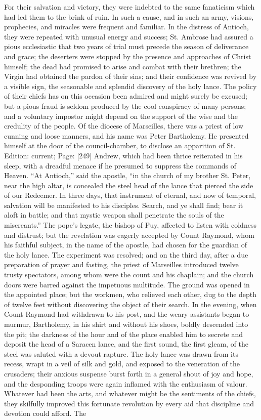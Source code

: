 For their salvation and victory, they were indebted to the same fanaticism which had led them to the brink of ruin. In such a cause, and in such an army, visions, prophecies, and miracles were frequent and familiar. In the distress of Antioch, they were repeated with unusual energy and success; St. Ambrose had assured a pious ecclesiastic that two years of trial must precede the season of deliverance and grace; the deserters were stopped by the presence and approaches of Christ himself; the dead had promised to arise and combat with their brethren; the Virgin had obtained the pardon of their sins; and their confidence was revived by a visible sign, the seasonable and splendid discovery of the holy lance. The policy of their chiefs has on this occasion been admired and might surely be excused; but a pious fraud is seldom produced by the cool conspiracy of many persons; and a voluntary impostor might depend on the support of the wise and the credulity of the people. Of the diocese of Marseilles, there was a priest of low cunning and loose manners, and his name was Peter Bartholemy. He presented himself at the door of the council-chamber, to disclose an apparition of St. Edition: current; Page: [249] Andrew, which had been thrice reiterated in his sleep, with a dreadful menace if he presumed to suppress the commands of Heaven. \texthebrew{“}At Antioch,\texthebrew{}” said the apostle, \texthebrew{“}in the church of my brother St. Peter, near the high altar, is concealed the steel head of the lance that pierced the side of our Redeemer. In three days, that instrument of eternal, and now of temporal, salvation will be manifested to his disciples. Search, and ye shall find; bear it aloft in battle; and that mystic weapon shall penetrate the souls of the miscreants.\texthebrew{}” The pope\texthebrew{}’s legate, the bishop of Puy, affected to listen with coldness and distrust; but the revelation was eagerly accepted by Count Raymond, whom his faithful subject, in the name of the apostle, had chosen for the guardian of the holy lance. The experiment was resolved; and on the third day, after a due preparation of prayer and fasting, the priest of Marseilles introduced twelve trusty spectators, among whom were the count and his chaplain; and the church doors were barred against the impetuous multitude. The ground was opened in the appointed place; but the workmen, who relieved each other, dug to the depth of twelve feet without discovering the object of their search. In the evening, when Count Raymond had withdrawn to his post, and the weary assistants began to murmur, Bartholemy, in his shirt and without his shoes, boldly descended into the pit; the darkness of the hour and of the place enabled him to secrete and deposit the head of a Saracen lance, and the first sound, the first gleam, of the steel was saluted with a devout rapture. The holy lance was drawn from its recess, wrapt in a veil of silk and gold, and exposed to the veneration of the crusaders; their anxious suspense burst forth in a general shout of joy and hope, and the desponding troops were again inflamed with the enthusiasm of valour. Whatever had been the arts, and whatever might be the sentiments of the chiefs, they skilfully improved this fortunate revolution by every aid that discipline and devotion could afford. The 